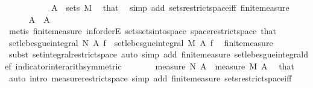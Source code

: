 \begin{isabellebody}
\ \ \isamarkupfalse%
\ {\isacharminus}{\kern0pt}\isanewline
\ \ \ \ \isamarkupfalse%
\ {\isacharasterisk}{\kern0pt}{\isacharcolon}{\kern0pt}\ {\isachardoublequoteopen}A\ {\isasymin}\ sets\ M{\isachardoublequoteclose}\ \isamarkupfalse%
\ that\ \isamarkupfalse%
\ {\isacharparenleft}{\kern0pt}simp\ add{\isacharcolon}{\kern0pt}\ sets{\isacharunderscore}{\kern0pt}restrict{\isacharunderscore}{\kern0pt}space{\isacharunderscore}{\kern0pt}iff\ finite{\isacharunderscore}{\kern0pt}measure{\isacharparenright}{\kern0pt}\isanewline
\ \ \ \ \isamarkupfalse%
\ {\isachardoublequoteopen}A\ {\isacharequal}{\kern0pt}\ A\ {\isasyminter}\ {\isasymOmega}{\isachardoublequoteclose}\ \isamarkupfalse%
\ {\isacharparenleft}{\kern0pt}metis\ finite{\isacharunderscore}{\kern0pt}measure{\isacharparenleft}{\kern0pt}{}{\isacharcomma}{\kern0pt}{}{\isacharparenright}{\kern0pt}\ inf{\isachardot}{\kern0pt}orderE\ sets{\isachardot}{\kern0pt}sets{\isacharunderscore}{\kern0pt}into{\isacharunderscore}{\kern0pt}space\ space{\isacharunderscore}{\kern0pt}restrict{\isacharunderscore}{\kern0pt}space\ that{\isacharparenleft}{\kern0pt}{}{\isacharparenright}{\kern0pt}{\isacharparenright}{\kern0pt}\isanewline
\ \ \ \ \isamarkupfalse%
\ {\isachardoublequoteopen}set{\isacharunderscore}{\kern0pt}lebesgue{\isacharunderscore}{\kern0pt}integral\ N\ A\ f\ {\isacharequal}{\kern0pt}\ set{\isacharunderscore}{\kern0pt}lebesgue{\isacharunderscore}{\kern0pt}integral\ M\ A\ f{\isachardoublequoteclose}\ \isamarkupfalse%
\ finite{\isacharunderscore}{\kern0pt}measure\ \isamarkupfalse%
\ {\isacharparenleft}{\kern0pt}subst\ set{\isacharunderscore}{\kern0pt}integral{\isacharunderscore}{\kern0pt}restrict{\isacharunderscore}{\kern0pt}space{\isacharcomma}{\kern0pt}\ auto\ simp\ add{\isacharcolon}{\kern0pt}\ finite{\isacharunderscore}{\kern0pt}measure\ set{\isacharunderscore}{\kern0pt}lebesgue{\isacharunderscore}{\kern0pt}integral{\isacharunderscore}{\kern0pt}def\ indicator{\isacharunderscore}{\kern0pt}inter{\isacharunderscore}{\kern0pt}arith{\isacharbrackleft}{\kern0pt}symmetric{\isacharbrackright}{\kern0pt}{\isacharparenright}{\kern0pt}\isanewline
\ \ \ \ \isamarkupfalse%
\ \isamarkupfalse%
\ {\isachardoublequoteopen}measure\ N\ A\ {\isacharequal}{\kern0pt}\ measure\ M\ A{\isachardoublequoteclose}\ \isamarkupfalse%
\ that\ \isamarkupfalse%
\ {\isacharparenleft}{\kern0pt}auto\ intro{\isacharbang}{\kern0pt}{\isacharcolon}{\kern0pt}\ measure{\isacharunderscore}{\kern0pt}restrict{\isacharunderscore}{\kern0pt}space\ simp\ add{\isacharcolon}{\kern0pt}\ finite{\isacharunderscore}{\kern0pt}measure\ sets{\isacharunderscore}{\kern0pt}restrict{\isacharunderscore}{\kern0pt}space{\isacharunderscore}{\kern0pt}iff{\isacharparenright}{\kern0pt}\isanewline

\end{isabellebody}
